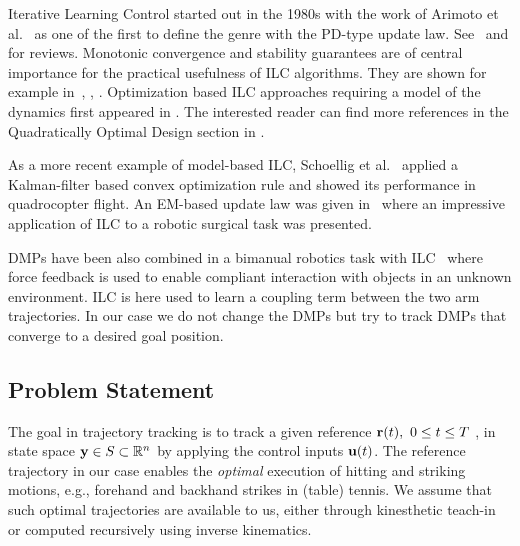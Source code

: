 Iterative Learning Control started out in the 1980s with the work of Arimoto et al.~\cite{Arimoto84} as one of the first to define the genre with the PD-type update law. See~\cite{Bristow06} and \cite{Moore99} for reviews. Monotonic convergence and stability guarantees are of central importance for the practical usefulness of ILC algorithms. They are shown for example in~\cite{Bristow06}, \cite{Norrloef02}, \cite{Longman2000}. Optimization based ILC approaches requiring a model of the dynamics first appeared in \cite{Amann95}. The interested reader can find more references in the Quadratically Optimal Design section in \cite{Bristow06}.

As a more recent example of model-based ILC, Schoellig et al.~\cite{Schoellig12} applied a Kalman-filter based convex optimization rule and showed its performance in quadrocopter flight. An EM-based update law was given in~\cite{Berg10} where an impressive application of ILC to a robotic surgical task was presented.

DMPs have been also combined in a bimanual robotics task with ILC~\cite{Gams13} where force feedback is used to enable compliant interaction with objects in an unknown environment. ILC is here used to learn a coupling term between the two arm trajectories. In our case we do not change the DMPs but try to track DMPs that converge to a desired goal position.

\subsection{Problem Statement}\label{problemStatement}

The goal in trajectory tracking is to track a given reference $\boldsymbol{\mathrm{r}}(t), \ 0 \leq t \leq T \ $, in state space $\boldsymbol{\mathrm{y}} \in S \subset \mathbb{R}^{n}$ by applying the control inputs $\boldsymbol{\mathrm{u}}(t)$. The reference trajectory in our case enables the \emph{optimal} execution of hitting and striking motions, e.g., forehand and backhand strikes in (table) tennis. We assume that such optimal trajectories are available to us, either through kinesthetic teach-in or computed recursively using inverse kinematics.

